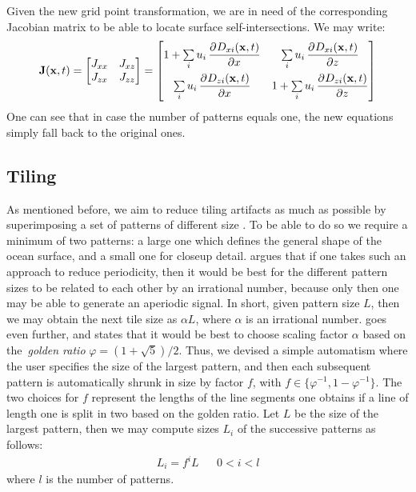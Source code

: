 Given the new grid point transformation, we are in need of the corresponding
Jacobian matrix to be able to locate surface self-intersections. We may write:
\begin{equation}
\label{eq:jacobian_of_displacement_multi}
 \mvec{J}(\mvec{x},t) =
 \begin{bmatrix}
 J_{xx} & J_{xz} \\
 J_{zx} & J_{zz}
 \end{bmatrix}
 =
 \begin{bmatrix}
   1 + \sum\limits_i u_i\dpd{D_{xi}(\mvec{x},t)}{x} & \sum\limits_i u_i\dpd{D_{xi}(\mvec{x},t)}{z} \\[1em]
   \sum\limits_i u_i\dpd{D_{zi}(\mvec{x},t)}{x} & 1 + \sum\limits_i u_i\dpd{D_{zi}(\mvec{x},t)}{z}
 \end{bmatrix}
\end{equation}
%
One can see that in case the number of patterns equals one, the new equations
simply fall back to the original ones.
%
\subsection{Tiling}
As mentioned before, we aim to reduce tiling artifacts as much as possible
by superimposing a set of patterns of different size \citep{misc:oceanlightingfft}.
To be able to do so we require a minimum of two patterns: a large one which defines
the general shape of the ocean surface, and a small one for closeup detail.
\citet{Bridson:2015} argues that if one takes such an approach to reduce
periodicity, then it would be best for the different pattern sizes to be related
to each other by an irrational number, because only then one may be able to
generate an aperiodic signal. In short, given pattern size $L$, then we may
obtain the next tile size as $\alpha L$, where $\alpha$ is an irrational number.
\citeauthor{Bridson:2015} goes even further, and states that it would
be best to choose scaling factor $\alpha$ based on the~\emph{golden ratio}
$\varphi = (1 + \sqrt{5})/2$.
Thus, we devised a simple automatism where the user specifies the size of the
largest pattern, and then each subsequent pattern is automatically shrunk in
size by factor $f$, with $f \in \{\varphi^{-1}, 1 - \varphi^{-1}\}$. The two
choices for $f$ represent the lengths of the line segments one obtains if a
line of length one is split in two based on the golden ratio.
Let $L$ be the size of the largest pattern, then we may compute sizes $L_i$ of
the successive patterns as follows:
\begin{align}
\label{eq:pattern_size_i}
 L_i = f^{i} L && 0 < i < l
\end{align}
where $l$ is the number of patterns.

